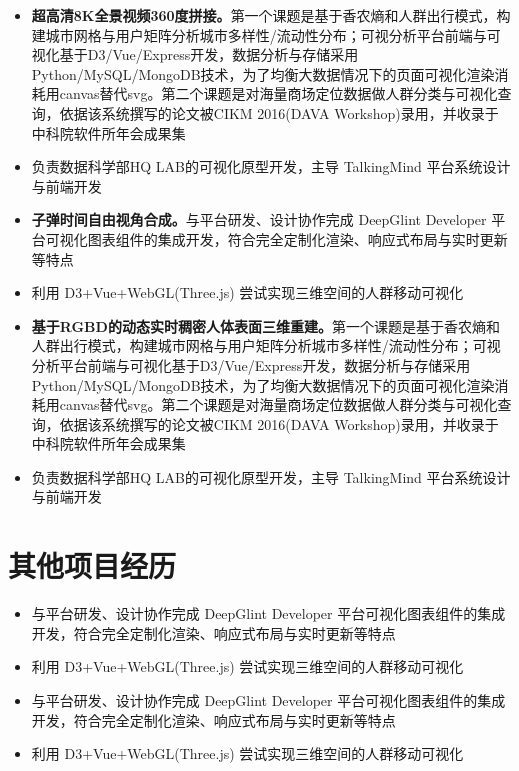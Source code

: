 \documentclass{resume}
\begin{document}
\begin{itemize}
  \item \textbf{超高清8K全景视频360度拼接。}第一个课题是基于香农熵和人群出行模式，构建城市网格与用户矩阵分析城市多样性/流动性分布；可视分析平台前端与可视化基于D3/Vue/Express开发，数据分析与存储采用Python/MySQL/MongoDB技术，为了均衡大数据情况下的页面可视化渲染消耗用canvas替代svg。第二个课题是对海量商场定位数据做人群分类与可视化查询，依据该系统撰写的论文被CIKM 2016(DAVA Workshop)录用，并收录于中科院软件所年会成果集
  \item 负责数据科学部HQ LAB的可视化原型开发，主导 TalkingMind 平台系统设计与前端开发
\end{itemize}

\begin{itemize}
  \item \textbf{子弹时间自由视角合成。}与平台研发、设计协作完成 DeepGlint Developer 平台可视化图表组件的集成开发，符合完全定制化渲染、响应式布局与实时更新等特点
  \item 利用 D3+Vue+WebGL(Three.js) 尝试实现三维空间的人群移动可视化
\end{itemize}

\begin{itemize}
  \item \textbf{基于RGBD的动态实时稠密人体表面三维重建。}第一个课题是基于香农熵和人群出行模式，构建城市网格与用户矩阵分析城市多样性/流动性分布；可视分析平台前端与可视化基于D3/Vue/Express开发，数据分析与存储采用Python/MySQL/MongoDB技术，为了均衡大数据情况下的页面可视化渲染消耗用canvas替代svg。第二个课题是对海量商场定位数据做人群分类与可视化查询，依据该系统撰写的论文被CIKM 2016(DAVA Workshop)录用，并收录于中科院软件所年会成果集
  \item 负责数据科学部HQ LAB的可视化原型开发，主导 TalkingMind 平台系统设计与前端开发
\end{itemize}

\section{其他项目经历}
\begin{itemize}
  \item 与平台研发、设计协作完成 DeepGlint Developer 平台可视化图表组件的集成开发，符合完全定制化渲染、响应式布局与实时更新等特点
  \item 利用 D3+Vue+WebGL(Three.js) 尝试实现三维空间的人群移动可视化
\end{itemize}
\begin{itemize}
  \item 与平台研发、设计协作完成 DeepGlint Developer 平台可视化图表组件的集成开发，符合完全定制化渲染、响应式布局与实时更新等特点
  \item 利用 D3+Vue+WebGL(Three.js) 尝试实现三维空间的人群移动可视化
\end{itemize}
\end{document}
